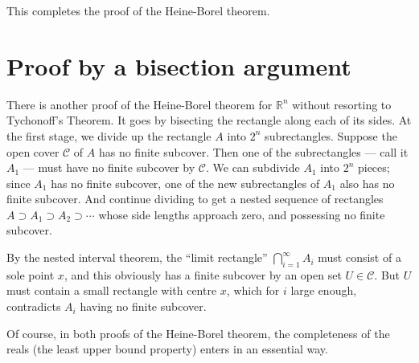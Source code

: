 \documentclass[12pt]{article}
\newcommand{\real}{\mathbb{R}}
\begin{document}
This completes the proof of the Heine-Borel theorem.

\section*{Proof by a bisection argument}
There is another proof of the Heine-Borel theorem for $\real^n$ without
resorting to Tychonoff's Theorem.  It goes by bisecting the rectangle along each of its sides.
At the first stage, we divide up the rectangle $A$ into $2^n$ subrectangles.
Suppose the open cover $\mathcal{C}$ of $A$ has no finite subcover.
Then one of the subrectangles --- call it $A_1$ ---
must have no finite subcover by $\mathcal{C}$.  We can subdivide $A_1$ into $2^n$ pieces; since $A_1$
has no finite subcover, one of the new subrectangles of $A_1$ also has no finite subcover.  And continue
dividing to get a nested sequence of rectangles $A \supset A_1 \supset A_2 \supset \dotsb$
whose side lengths approach zero, and possessing no finite subcover.

By the nested interval theorem, the ``limit rectangle'' 
$\bigcap_{i=1}^\infty A_i$ must consist of a sole point $x$,
and this obviously has a finite subcover by an open set $U \in \mathcal{C}$.
But $U$ must contain a small rectangle with centre $x$, which 
for $i$ large enough, contradicts $A_i$ having no finite subcover.

Of course, in both proofs of the Heine-Borel theorem, the completeness of the reals (the least upper bound property)
enters in an essential way.
\end{document}
